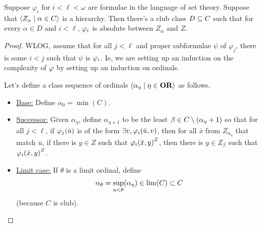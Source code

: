\begin{boxtheorem} \label{Ch3:Thm:Reflection}
    Suppose $\varphi_i$ for $i < \ell < \omega$ are formulae in the language of set theory. Suppose that $\left\langle Z_{\alpha} \; \middle| \; \alpha \in C \right\rangle$ is a hierarchy. Then there's a club class $D \subseteq C$ such that for every $\alpha \in D$ and $i < \ell$, $\varphi_i$ is absolute between $Z_{\alpha}$ and $Z$.
\end{boxtheorem}
\begin{proof}
    WLOG, assume that for all $j < \ell$ and proper subformulae $\psi$ of $\varphi_j$, there is some $i < j$ such that $\psi$ is $\varphi_{i}$. Ie, we are setting up an induction on the complexity of $\varphi$ by setting up an induction on ordinals.

    Let's define a class sequence of ordinals $\left\langle \alpha_{\eta} \; \middle| \; \eta \in \mathbf{OR} \right\rangle$ as follows.
    \begin{itemize}
        \item \underline{Base:} Define $\alpha_0 = \min(C)$.
        \item \underline{Successor:} Given $\alpha_{\eta}$, define $\alpha_{\eta + 1}$ to be the least $\beta \in C \setminus \left( \alpha_{\eta} + 1 \right)$ so that for all $j < \ell$, if $\varphi_{j}\!\left( \bar{u} \right)$ is of the form $\exists v, \varphi_i\!\left( \bar{u}, v \right)$, then for all $\bar{x}$ from $Z_{\alpha_{\eta}}$ that match $\bar{u}$, if there is $y \in Z$ such that $\varphi_i\!\left( \bar{x}, y \right)^Z$, then there is $y \in Z_{\beta}$ such that $\varphi_i\!\left( \bar{x}, y \right)^Z$.
        \item \underline{Limit case:} If $\theta$ is a limit ordinal, define
        \begin{align*}
            \alpha_{\theta} = \sup_{\eta < \theta} \!\left( \alpha_{\eta} \right) \in \lim(C) \subset C
        \end{align*}
        (because $C$ is club).
    \end{itemize}


\end{proof}
